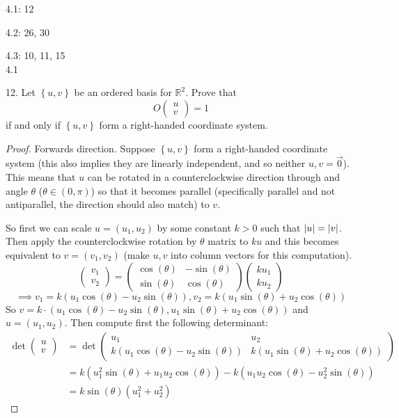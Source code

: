 \documentclass[11pt]{article}
\newcommand{\br}[1]{\left(#1\right)}
\newcommand{\cbr}[1]{\left\{#1\right\}}
\begin{document}
4.1: 12

4.2: 26, 30

4.3: 10, 11, 15 \\

4.1 

12. Let $\cbr{u,v}$ be an ordered basis for $\mathbb{R}^2$. Prove that $$O\begin{pmatrix}
    u \\ v
\end{pmatrix} = 1$$ if and only if $\cbr{u,v}$ form a right-handed coordinate system.

\begin{proof}
    Forwards direction. Suppose $\cbr{u,v}$ form a right-handed coordinate system (this also implies they are linearly independent, and so neither $u,v = \vec{0}$). This means that $u$ can be rotated in a counterclockwise direction through and angle $\theta$ ($\theta \in \br{0,\pi}$) so that it becomes parallel (specifically parallel and not antiparallel, the direction should also match) to $v$.

    So first we can scale $u = (u_1,u_2)$ by some constant $k>0$ such that $\abs{u} = \abs{v}$. Then apply the counterclockwise rotation by $\theta$ matrix to $ku$ and this becomes equivalent to $v = (v_1,v_2)$ (make $u,v$ into column vectors for this computation). $$\begin{pmatrix} v_1 \\ v_2 \end{pmatrix} = \begin{pmatrix}
        \cos(\theta) & -\sin(\theta) \\
        \sin(\theta) & \cos(\theta)
    \end{pmatrix} \begin{pmatrix} ku_1 \\ ku_2 \end{pmatrix}$$
    $$\implies v_1 = k\br{u_1\cos(\theta) - u_2\sin(\theta)}, v_2 = k\br{u_1\sin(\theta) + u_2\cos(\theta)}$$ So $v = k\cdot (u_1\cos(\theta) - u_2\sin(\theta), u_1\sin(\theta) + u_2\cos(\theta))$ and $u = (u_1,u_2)$. Then compute first the following determinant: 
    \begin{align*}
        \det\begin{pmatrix}
        u \\ v
        \end{pmatrix} &= \det\begin{pmatrix}
        u_1 & u_2 \\
        k\br{u_1\cos(\theta) - u_2\sin(\theta)} & k\br{u_1\sin(\theta) + u_2\cos(\theta)}
        \end{pmatrix} \\
        &= k\br{u_1^2\sin(\theta) + u_1u_2\cos(\theta)} - k\br{u_1u_2\cos(\theta) - u_2^2\sin(\theta)} \\
        &= k\sin(\theta)\br{u_1^2+u_2^2}
    \end{align*}


\end{proof}
\end{document}
